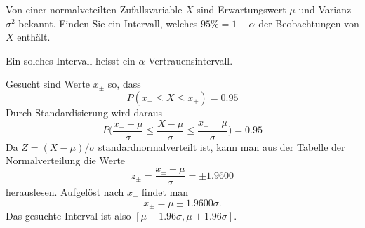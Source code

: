 Von einer normalveteilten Zufallsvariable $X$ sind Erwartungswert $\mu$
und Varianz $\sigma^2$ bekannt. Finden Sie ein Intervall, welches
$95\%=1-\alpha$ der Beobachtungen von $X$ enthält.

Ein solches Intervall heisst ein $\alpha$-Vertrauensintervall.


\begin{loesung}
Gesucht sind Werte $x_\pm$ so, dass 
\[
P(x_-\le X\le x_+)=0.95
\]
Durch Standardisierung wird daraus
\[
P\biggl(\frac{x_--\mu}{\sigma}\le \frac{X-\mu}{\sigma} \le \frac{x_+-\mu}{\sigma}\biggr)
=0.95
\]
Da $Z=(X-\mu)/\sigma$ standardnormalverteilt ist, kann man aus der
Tabelle der Normalverteilung die Werte
\[
z_\pm=\frac{x_\pm -\mu}{\sigma}=\pm1.9600
\]
herauslesen. Aufgelöst nach $x_\pm$ findet man
\[
x_\pm = \mu\pm1.9600\sigma.
\]
Das gesuchte Interval ist also $[\mu-1.96\sigma,\mu+1.96\sigma]$.
\end{loesung}

